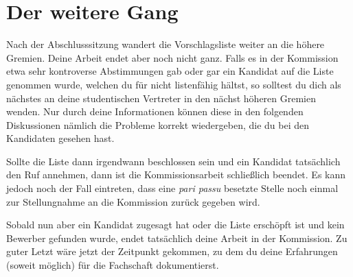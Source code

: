 \section{Der weitere Gang}
Nach der Abschlusssitzung wandert die Vorschlagsliste weiter an die höhere Gremien. Deine Arbeit endet aber noch nicht ganz. Falls es in der Kommission etwa sehr kontroverse Abstimmungen gab oder gar ein Kandidat auf die Liste genommen wurde, welchen du für nicht listenfähig hältst, so solltest du dich als nächstes an deine studentischen Vertreter in den nächst höheren Gremien wenden. Nur durch deine Informationen können diese in den folgenden Diskussionen nämlich die Probleme korrekt wiedergeben, die du bei den Kandidaten gesehen hast.

Sollte die Liste dann irgendwann beschlossen sein und ein Kandidat tatsächlich den Ruf annehmen, dann ist die Kommissionsarbeit schließlich beendet. Es kann jedoch noch der Fall eintreten, dass eine \emph{pari passu} besetzte Stelle noch einmal zur Stellungnahme an die Kommission zurück gegeben wird.

Sobald nun aber ein Kandidat zugesagt hat oder die Liste erschöpft ist und kein Bewerber gefunden wurde, endet tatsächlich deine Arbeit in der Kommission. Zu guter Letzt wäre jetzt der Zeitpunkt gekommen, zu dem du deine Erfahrungen (soweit möglich) für die Fachschaft dokumentierst.

